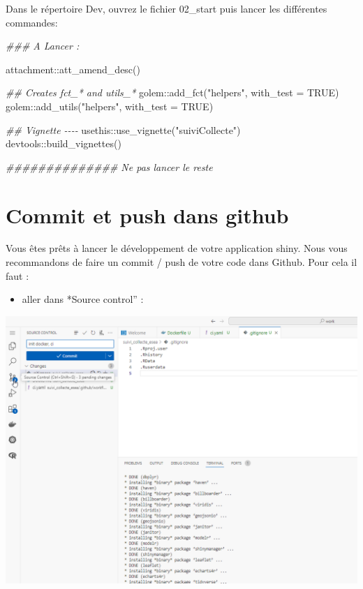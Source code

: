 \documentclass[
  letterpaper,
  DIV=11,
  numbers=noendperiod]{scrreprt}
\newenvironment{Shaded}{\begin{snugshade}}{\end{snugshade}}
\newcommand{\AttributeTok}[1]{\textcolor[rgb]{0.40,0.45,0.13}{#1}}
\newcommand{\ConstantTok}[1]{\textcolor[rgb]{0.56,0.35,0.01}{#1}}
\newcommand{\DocumentationTok}[1]{\textcolor[rgb]{0.37,0.37,0.37}{\textit{#1}}}
\newcommand{\FunctionTok}[1]{\textcolor[rgb]{0.28,0.35,0.67}{#1}}
\newcommand{\NormalTok}[1]{\textcolor[rgb]{0.00,0.23,0.31}{#1}}
\newcommand{\SpecialCharTok}[1]{\textcolor[rgb]{0.37,0.37,0.37}{#1}}
\newcommand{\StringTok}[1]{\textcolor[rgb]{0.13,0.47,0.30}{#1}}
\providecommand{\tightlist}{%
  \setlength{\itemsep}{0pt}\setlength{\parskip}{0pt}}\usepackage{longtable,booktabs,array}
\begin{document}
Dans le répertoire Dev, ouvrez le fichier 02\_start puis lancer les
différentes commandes:

\begin{Shaded}
\begin{Highlighting}[]
\DocumentationTok{\#\#\# A Lancer :}

\NormalTok{attachment}\SpecialCharTok{::}\FunctionTok{att\_amend\_desc}\NormalTok{()}

\DocumentationTok{\#\# Creates fct\_* and utils\_*}
\NormalTok{golem}\SpecialCharTok{::}\FunctionTok{add\_fct}\NormalTok{(}\StringTok{"helpers"}\NormalTok{, }\AttributeTok{with\_test =} \ConstantTok{TRUE}\NormalTok{)}
\NormalTok{golem}\SpecialCharTok{::}\FunctionTok{add\_utils}\NormalTok{(}\StringTok{"helpers"}\NormalTok{, }\AttributeTok{with\_test =} \ConstantTok{TRUE}\NormalTok{)}

\DocumentationTok{\#\# Vignette {-}{-}{-}{-}}
\NormalTok{usethis}\SpecialCharTok{::}\FunctionTok{use\_vignette}\NormalTok{(}\StringTok{"suiviCollecte"}\NormalTok{)}
\NormalTok{devtools}\SpecialCharTok{::}\FunctionTok{build\_vignettes}\NormalTok{()}


\DocumentationTok{\#\#\#\#\#\#\#\#\#\#\#\#\#\# Ne pas lancer le reste}
\end{Highlighting}
\end{Shaded}

\hypertarget{commit-et-push-dans-github}{%
\section{Commit et push dans github}\label{commit-et-push-dans-github}}

Vous êtes prêts à lancer le développement de votre application shiny.
Nous vous recommandons de faire un commit / push de votre code dans
Github. Pour cela il faut :

\begin{itemize}
\tightlist
\item
  aller dans *Source control'' :
\end{itemize}

\includegraphics{./images/vscode_first_git.png}
\end{document}
